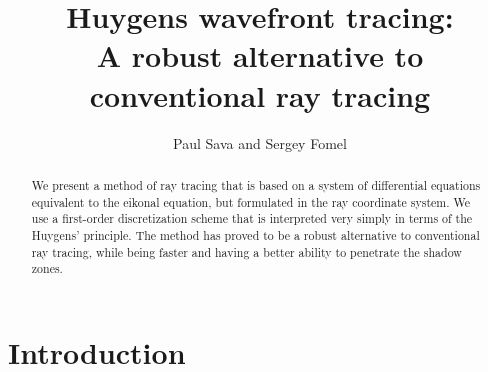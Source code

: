 
\title{Huygens wavefront tracing: \\ A robust alternative to conventional
ray tracing}


\author{Paul Sava and Sergey Fomel}

\maketitle

\begin{abstract}
We present a method of ray tracing that is based on a system of
differential equations equivalent to the eikonal equation, but formulated
in the ray coordinate system. We use a first-order discretization scheme
that is interpreted very simply in terms of the Huygens' principle. The
method has proved to be a robust alternative to conventional ray tracing,
while being faster and having a better ability to penetrate the shadow
zones.
\end{abstract}

\section{Introduction}

